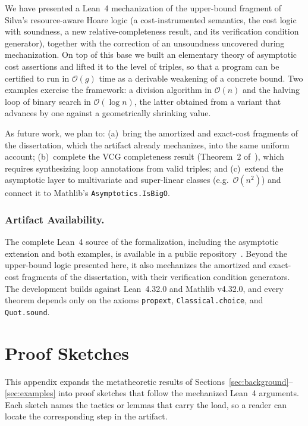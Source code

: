 \documentclass[runningheads]{llncs}
\newcommand{\Lean}{Lean~4\xspace}
\newcommand{\BigO}{\mathcal{O}}
\newcommand{\code}[1]{\texttt{#1}}
\begin{document}
We have presented a \Lean{} mechanization of the upper-bound fragment of Silva's
resource-aware Hoare logic (a cost-instrumented semantics, the cost logic with
soundness, a new relative-completeness result, and its verification condition
generator), together with the correction of an unsoundness uncovered during
mechanization.
On top of this base we built an elementary theory of asymptotic cost assertions
and lifted it to the level of triples, so that a program can be certified to run
in $\BigO(g)$ time as a derivable weakening of a concrete bound.
Two examples exercise the framework: a division algorithm in $\BigO(n)$ and the
halving loop of binary search in $\BigO(\log n)$, the latter obtained from a
variant that advances by one against a geometrically shrinking value.

As future work, we plan to: (a)~bring the amortized and exact-cost fragments of
the dissertation, which the artifact already mechanizes, into the same uniform
account; (b)~complete the VCG completeness result
(Theorem~2 of~\cite{Silva2022}), which requires synthesizing loop annotations
from valid triples; and (c)~extend the asymptotic layer to multivariate and
super-linear classes (e.g.\ $\BigO(n^2)$) and connect it to
Mathlib's \code{Asymptotics.IsBigO}.

\subsubsection{Artifact Availability.}
The complete \Lean{} source of the formalization, including the asymptotic
extension and both examples, is available in a public repository~\cite{repo-logic}.
Beyond the upper-bound logic presented here, it also mechanizes the
amortized and exact-cost fragments of the dissertation, with their verification
condition generators.
The development builds against Lean~4.32.0 and Mathlib v4.32.0, and every
theorem depends only on the axioms \code{propext}, \code{Classical.choice}, and
\code{Quot.sound}.




\appendix

\section{Proof Sketches}\label{sec:appendix}

This appendix expands the metatheoretic results of
Sections~\ref{sec:background}--\ref{sec:examples} into proof sketches that follow
the mechanized \Lean{} arguments. Each sketch names the tactics or lemmas that
carry the load, so a reader can locate the corresponding step in the artifact.
\end{document}
